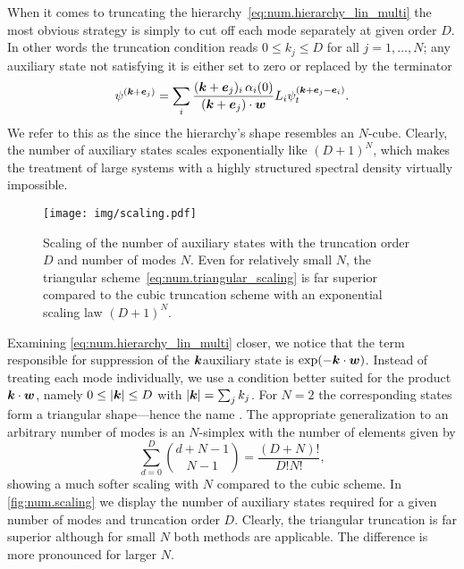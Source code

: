 When it comes to truncating the hierarchy~\ref{eq:num.hierarchy_lin_multi} the most obvious strategy is simply to cut off each mode separately at given order $D$.
In other words the truncation condition reads $0 \le k_j \le D$ for all $j=1,\dots,N$; any auxiliary state not satisfying it is either set to zero or replaced by the terminator
\begin{equation*}
  \psi^{(\boldsymbol{k}+\boldsymbol{e}_j)}
  = \sum_i  \frac{(\boldsymbol{k} + \boldsymbol{e}_j)_i \, \alpha_i(0)}{(\boldsymbol{k}+\boldsymbol{e}_j)\cdot\boldsymbol{w}} L_i \psi^{(\boldsymbol{k} +\boldsymbol{e}_j - \boldsymbol{e}_i)}_t.
\end{equation*}
We refer to this as the  since the hierarchy's shape resembles an $N$-cube. %
Clearly, the number of auxiliary states scales exponentially like $(D+1)^N$, which makes the treatment of large systems with a highly structured spectral density virtually impossible.

\begin{figure}
  \centering
  \texttt{[image: img/scaling.pdf]}
  \caption{%
    Scaling of the number of auxiliary states with the truncation order $D$ and number of modes $N$.
    Even for relatively small $N$, the triangular scheme~\ref{eq:num.triangular_scaling} is far superior compared to the cubic truncation scheme with an exponential scaling law $(D+1)^N$.
  }
  \label{fig:num.scaling}
\end{figure}

Examining \autoref{eq:num.hierarchy_lin_multi} closer, we notice that the term responsible for suppression of the $\boldsymbol{k}$\th auxiliary state is $\exp(-\kk \cdot \ww)$.
Instead of treating each mode individually, we use a condition better suited for the product $\boldsymbol{k}\cdot\boldsymbol{w}$, namely $0 \le \vert \boldsymbol{k} \vert \le D$ with $\vert \boldsymbol{k} \vert = \sum_j k_j$.
For $N=2$ the corresponding states form a triangular shape---hence the name .
The appropriate generalization to an arbitrary number of modes is an $N$-simplex with the number of elements given by
\begin{equation}
  \sum_{d=0}^D {d + N - 1 \choose N - 1} = \frac{(D + N)!}{D!N!},
  \label{eq:num.triangular_scaling}
\end{equation}
showing a much softer scaling with $N$ compared to the cubic scheme.
In \autoref{fig:num.scaling} we display the number of auxiliary states required for a given number of modes and truncation order $D$.
Clearly, the triangular truncation is far superior although for small $N$ both methods are applicable.
The difference is more pronounced for larger $N$.

